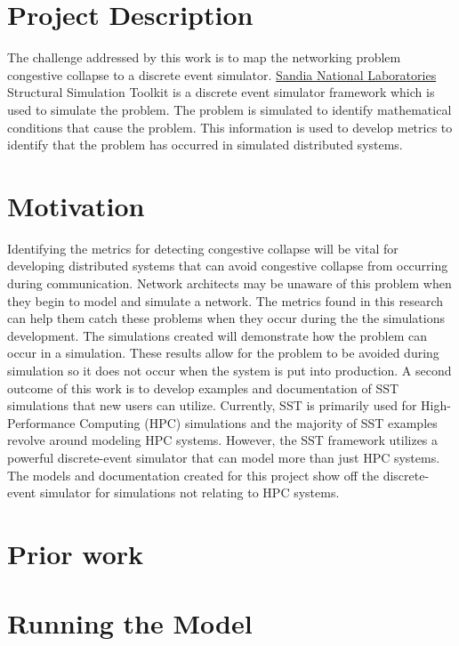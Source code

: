 \documentclass{article}
\begin{document}
\section{Project Description} %

The challenge addressed by this work is to map the networking problem congestive collapse to a discrete event simulator. \href{https://www.sandia.gov/}{Sandia National Laboratories} Structural Simulation Toolkit is a discrete event simulator framework which is used to simulate the problem. The problem is simulated to identify mathematical conditions that cause the problem. This information is used to develop metrics to identify that the problem has occurred in simulated distributed systems.

\section{Motivation} %

Identifying the metrics for detecting congestive collapse will be vital for developing distributed systems that can avoid congestive collapse from occurring during communication. Network architects may be unaware of this problem when they begin to model and simulate a network. The metrics found in this research can help them catch these problems when they occur during the the simulations development. The simulations created will demonstrate how the problem can occur in a simulation. These results allow for the problem to be avoided during simulation so it does not occur when the system is put into production.
A second outcome of this work is to develop examples and documentation of SST simulations that new users can utilize. Currently, SST is primarily used for High-Performance Computing (HPC) simulations and the majority of SST examples revolve around modeling HPC systems. However, the SST framework utilizes a powerful discrete-event simulator that can model more than just HPC systems. The models and documentation created for this project show off the discrete-event simulator for simulations not relating to HPC systems.

\section{Prior work} %


\section{Running the Model}
\end{document}
